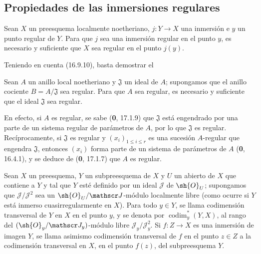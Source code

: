 \subsection{Propiedades de las inmersiones regulares}
\label{subsection:IV.19.1}

\begin{proposition}[19.1.1]
\label{IV.19.1.1}
Sean $X$ un preesquema localmente noetheriano, $j:Y\to X$ una inmersión e $y$ un punto regular de $Y$. Para que $j$ sea una inmersión regular en el punto $y$, es necesario y suficiente que $X$ sea regular en el punto $j(y)$.
\end{proposition}

Teniendo en cuenta (16.9.10), basta demostrar el

\begin{corollary}[19.1.2]
\label{IV.19.1.2}
Sean $A$ un anillo local noetheriano y $\mathfrak J$ un ideal de $A$; supongamos que el anillo cociente $B=A/\mathfrak J$ sea regular. Para que $A$ sea regular, es necesario y suficiente que el ideal $\mathfrak J$ sea regular.
\end{corollary}

En efecto, si $A$ es regular, se sabe (\textbf{0}, 17.1.9) que $\mathfrak J$ está engendrado por una parte de un sistema regular de parámetros de $A$, por lo que $\mathfrak J$ es regular. Recíprocamente, si $\mathfrak J$ es regular y $(x_i)_{1\leq i\leq r}$ es una sucesión $A$-regular que engendra $\mathfrak J$, entonces $(x_i)$ forma parte de un sistema de parámetros de $A$ (\textbf{0}, 16.4.1), y se deduce de (\textbf{0}, 17.1.7) que $A$ es regular.

\begin{definition}[19.1.3]
\label{IV.19.1.3}
Sean $X$ un preesquema, $Y$ un subpreesquema de $X$ y $U$ un abierto de $X$ que contiene a $Y$ y tal que $Y$ esté definido por un ideal $\mathscr J$ de $\sh{O}_U$; supongamos que $\mathscr J/\mathscr J^2$ sea un $\sh{O}_U/\mathscr J$-módulo localmente libre \textup{(como ocurre si $Y$ está inmerso cuasirregularmente en $X$)}. Para todo $y\in Y$, se llama codimensión transversal de $Y$ en $X$ en el punto $y$, y se denota por $\operatorname{codim}_y^*(Y,X)$, al rango del $(\sh{O}_y/\mathscr J_y)$-módulo libre $\mathscr J_y/\mathscr J_y^2$. Si $f:Z\to X$ es una inmersión de imagen $Y$, se llama asimismo codimensión transversal de $f$ en el punto $z\in Z$ a la codimensión transversal en $X$, en el punto $f(z)$, del subpreesquema $Y$.
\end{definition}

